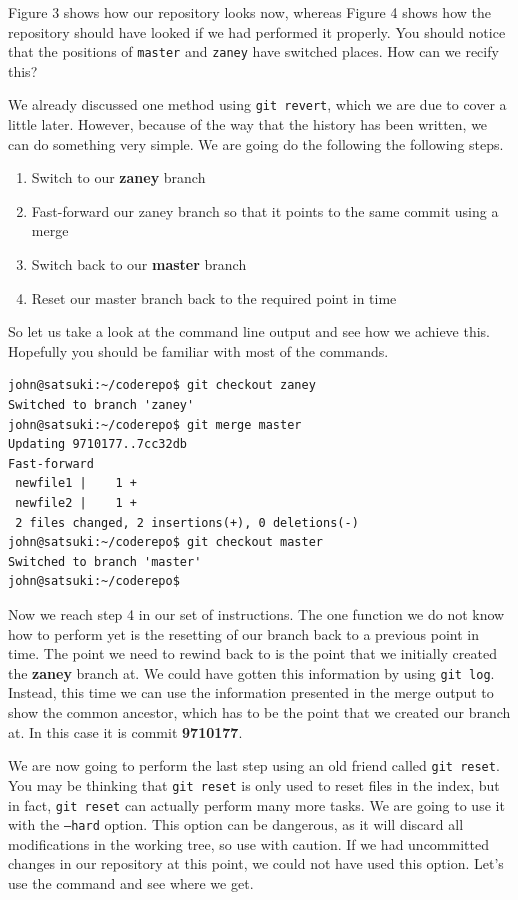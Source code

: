 Figure 3 shows how our repository looks now, whereas Figure 4 shows how the repository should have looked if we had performed it properly.  You should notice that the positions of \texttt{master} and \texttt{zaney} have switched places.  How can we recify this?

We already discussed one method using \texttt{git revert}, which we are due to cover a little later.  However, because of the way that the history has been written, we can do something very simple.  We are going do the following the following steps.

\begin{enumerate}
\item Switch to our \textbf{zaney} branch
\item Fast-forward our zaney branch so that it points to the same commit using a merge
\item Switch back to our \textbf{master} branch
\item Reset our master branch back to the required point in time
\end{enumerate}

So let us take a look at the command line output and see how we achieve this.  Hopefully you should be familiar with most of the commands.

\begin{Verbatim}
john@satsuki:~/coderepo$ git checkout zaney
Switched to branch 'zaney'
john@satsuki:~/coderepo$ git merge master
Updating 9710177..7cc32db
Fast-forward
 newfile1 |    1 +
 newfile2 |    1 +
 2 files changed, 2 insertions(+), 0 deletions(-)
john@satsuki:~/coderepo$ git checkout master
Switched to branch 'master'
john@satsuki:~/coderepo$ 
\end{Verbatim}

Now we reach step 4 in our set of instructions.  The one function we do not know how to perform yet is the resetting of our branch back to a previous point in time.  The point we need to rewind back to is the point that we initially created the \textbf{zaney} branch at.  We could have gotten this information by using \texttt{git log}.  Instead, this time we can use the information presented in the merge output to show the common ancestor, which has to be the point that we created our branch at.  In this case it is commit \textbf{9710177}.

We are now going to perform the last step using an old friend called \texttt{git reset}.  You may be thinking that \texttt{git reset} is only used to reset files in the index, but in fact, \texttt{git reset} can actually perform many more tasks.  We are going to use it with the \texttt{--hard} option.  This option can be dangerous, as it will discard all modifications in the working tree, so use with caution.  If we had uncommitted changes in our repository at this point, we could not have used this option.  Let's use the command and see where we get.

